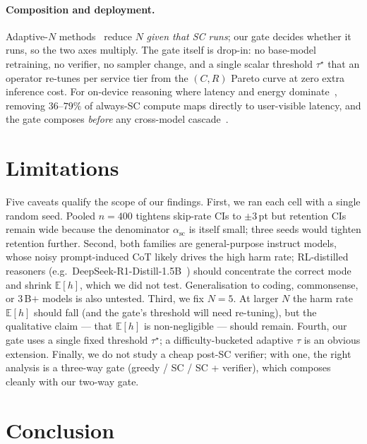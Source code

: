 \documentclass[11pt]{article}
\begin{document}
\paragraph{Composition and deployment.}
Adaptive-$N$ methods~\citep{Aggarwal2023AdaptiveConsistency,
Wan2024RASC,Manvi2024AdaptiveSampling} reduce $N$ \emph{given that
SC runs}; our gate decides whether it runs, so the two axes
multiply. The gate itself is drop-in: no base-model retraining, no
verifier, no sampler change, and a single scalar threshold
$\tau^{\star}$ that an operator re-tunes per service tier from the
$(C,R)$ Pareto curve at zero extra inference cost. For on-device
reasoning where latency and energy
dominate~\citep{Wang2025MNNLLM,Bsharat2025MobileMMLU,Cao2026PER},
removing $36$--$79\%$ of always-SC compute maps directly to
user-visible latency, and the gate composes \emph{before} any
cross-model cascade~\citep{Zheng2025CITER,Ong2024RouteLLM,
Chen2024FrugalGPT}.

\section*{Limitations}

Five caveats qualify the scope of our findings. First, we ran
each cell with a single random seed. Pooled $n{=}400$ tightens
skip-rate CIs to $\pm 3$\,pt but retention CIs remain wide
because the denominator $\alpha_\mathrm{sc}$ is itself small;
three seeds would tighten retention further. Second, both families
are general-purpose instruct models, whose noisy prompt-induced CoT
likely drives the high harm rate; RL-distilled reasoners
(e.g.\ DeepSeek-R1-Distill-1.5B~\citep{DeepSeekR1}) should
concentrate the correct mode and shrink $\mathbb{E}[h]$, which we
did not test. Generalisation to coding, commonsense, or $3$\,B$+$ models is
also untested. Third, we fix $N{=}5$. At larger
$N$ the harm rate $\mathbb{E}[h]$ should fall (and the gate's
threshold will need re-tuning), but the qualitative claim --- that
$\mathbb{E}[h]$ is non-negligible --- should remain. Fourth, our
gate uses a single fixed threshold $\tau^{\star}$; a
difficulty-bucketed adaptive $\tau$ is an obvious extension.
Finally, we do not study a cheap post-SC verifier; with one, the
right analysis is a three-way gate (greedy / SC / SC + verifier),
which composes cleanly with our two-way gate.

\section{Conclusion}
\end{document}

